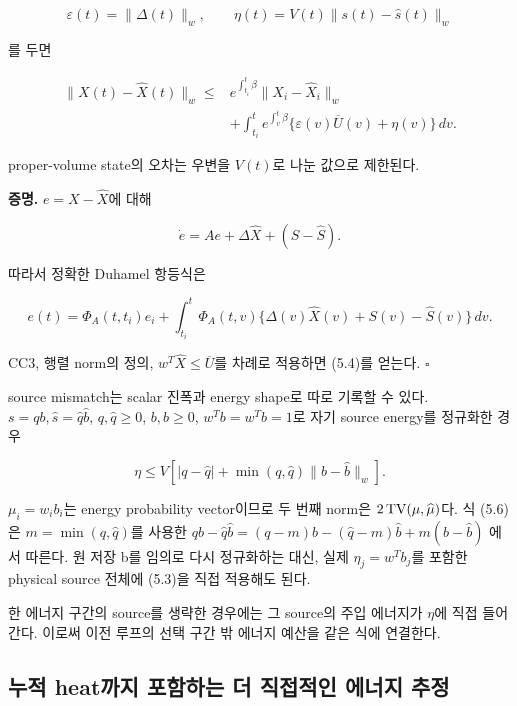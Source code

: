 \documentclass[11pt,a4paper]{article}
\begin{document}
\[
\varepsilon(t)=\|\Delta(t)\|_w,\qquad
\eta(t)=V(t)\|s(t)-\widehat s(t)\|_w
\tag{5.3}
\]

를 두면

\[
\boxed{
\begin{aligned}
\|X(t)-\widehat X(t)\|_w
\le {}&
e^{\int_{t_i}^{t}\beta}\|X_i-\widehat X_i\|_w\\
&+\int_{t_i}^{t}
e^{\int_v^t\beta}
\{\varepsilon(v)\overline U(v)+\eta(v)\}\,dv.
\end{aligned}
}
\tag{5.4}
\]

proper-volume state의 오차는 우변을 \(V(t)\)로 나눈 값으로 제한된다.

\textbf{증명.} \(e=X-\widehat X\)에 대해

\[
\dot e=Ae+\Delta\widehat X+(S-\widehat S).
\]

따라서 정확한 Duhamel 항등식은

\[
e(t)=\Phi_A(t,t_i)e_i+
\int_{t_i}^{t}\Phi_A(t,v)
\{\Delta(v)\widehat X(v)+S(v)-\widehat S(v)\}\,dv.
\tag{5.5}
\]

CC3, 행렬 norm의 정의, \(w^T\widehat X\le\overline U\)를 차례로 적용하면 (5.4)를 얻는다. \(\square\)

source mismatch는 scalar 진폭과 energy shape로 따로 기록할 수 있다. \(s=qb,\widehat s=\widehat q\widehat b\), \(q,\widehat q\ge0\), \(b,\widehat b\ge0\), \(w^Tb=w^T\widehat b=1\)로 자기 source energy를 정규화한 경우

\[
\boxed{
\eta\le V\left[
|q-\widehat q|
+\min(q,\widehat q)\|b-\widehat b\|_w
\right].
}
\tag{5.6}
\]

\(\mu_i=w_ib_i\)는 energy probability vector이므로 두 번째 norm은 \(2\,{\rm TV}(\mu,\widehat\mu)\)다. 식 (5.6)은 \(m=\min(q,\widehat q)\)를 사용한 \(qb-\widehat q\widehat b=(q-m)b-(\widehat q-m)\widehat b+m(b-\widehat b)\) 에서 따른다. 원 저장 b를 임의로 다시 정규화하는 대신, 실제 \(\eta_j=w^Tb_j\)를 포함한 physical source 전체에 (5.3)을 직접 적용해도 된다.

한 에너지 구간의 source를 생략한 경우에는 그 source의 주입 에너지가 \(\eta\)에 직접 들어간다. 이로써 이전 루프의 선택 구간 밖 에너지 예산을 같은 식에 연결한다.

\hypertarget{uxb204uxc801-heatuxae4cuxc9c0-uxd3ecuxd568uxd558uxb294-uxb354-uxc9c1uxc811uxc801uxc778-uxc5d0uxb108uxc9c0-uxcd94uxc815}{%
\subsection{누적 heat까지 포함하는 더 직접적인 에너지 추정}\label{uxb204uxc801-heatuxae4cuxc9c0-uxd3ecuxd568uxd558uxb294-uxb354-uxc9c1uxc811uxc801uxc778-uxc5d0uxb108uxc9c0-uxcd94uxc815}}
\end{document}
